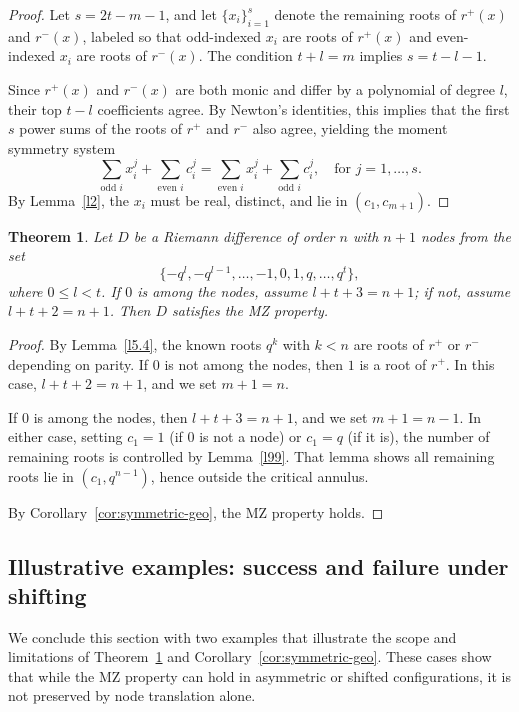 \documentclass{raex}
\newtheorem{theorem}{Theorem}
\theoremstyle{definition}
\begin{document}
\begin{proof}
Let \( s = 2t - m - 1 \), and let \( \{x_i\}_{i=1}^{s} \) denote the remaining roots of \( r^+(x) \) and \( r^-(x) \), labeled so that odd-indexed \( x_i \) are roots of \( r^+(x) \) and even-indexed \( x_i \) are roots of \( r^-(x) \). The condition \( t + l = m \) implies \( s = t - l - 1 \).

Since \( r^+(x) \) and \( r^-(x) \) are both monic and differ by a polynomial of degree \( l \), their top \( t - l \) coefficients agree. By Newton's identities, this implies that the first \( s \) power sums of the roots of \( r^+ \) and \( r^- \) also agree, yielding the moment symmetry system
\[
\sum_{\text{odd } i} x_i^j + \sum_{\text{even } i} c_i^j = \sum_{\text{even } i} x_i^j + \sum_{\text{odd } i} c_i^j, \quad \text{for } j = 1, \dots, s.
\]
By Lemma~\ref{l2}, the \( x_i \) must be real, distinct, and lie in \( (c_1, c_{m+1}) \).
\end{proof}
\begin{theorem}\label{t99}
Let $D$ be a Riemann difference of order $n$ with $n + 1$ nodes from the set
\[
\{-q^l, -q^{l-1}, \ldots, -1, 0, 1, q, \ldots, q^t\},
\]
where $0 \leq l < t$. If $0$ is among the nodes, assume $l + t + 3 = n + 1$; if not, assume $l + t + 2 = n + 1$. Then $D$ satisfies the MZ property.
\end{theorem}

\begin{proof}
By Lemma~\ref{l5.4}, the known roots $q^k$ with $k < n$ are roots of $r^+$ or $r^-$ depending on parity. If $0$ is not among the nodes, then $1$ is a root of $r^+$. In this case, $l + t + 2 = n + 1$, and we set $m + 1 = n$.

If $0$ is among the nodes, then $l + t + 3 = n + 1$, and we set $m + 1 = n - 1$. In either case, setting $c_1 = 1$ (if $0$ is not a node) or $c_1 = q$ (if it is), the number of remaining roots is controlled by Lemma~\ref{l99}. That lemma shows all remaining roots lie in $(c_1, q^{n-1})$, hence outside the critical annulus.

By Corollary~\ref{cor:symmetric-geo}, the MZ property holds.
\end{proof}

\subsection{Illustrative examples: success and failure under shifting}

We conclude this section with two examples that illustrate the scope and limitations of Theorem~\ref{t99} and Corollary~\ref{cor:symmetric-geo}. These cases show that while the MZ property can hold in asymmetric or shifted configurations, it is not preserved by node translation alone.
\end{document}
